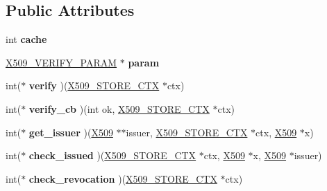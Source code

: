 \subsection*{Public Attributes}
\begin{DoxyCompactItemize}
\item 
\mbox{\label{structx509__store__st_a39100a4cc433d10485ffe0c30c5b88f8}} 
int {\bfseries cache}
\item 
\mbox{\label{structx509__store__st_a988c764019923790356d956bc071c50b}} 
\hyperlink{struct_x509___v_e_r_i_f_y___p_a_r_a_m__st}{X509\+\_\+\+V\+E\+R\+I\+F\+Y\+\_\+\+P\+A\+R\+AM} $\ast$ {\bfseries param}
\item 
\mbox{\label{structx509__store__st_a942efe26133aadd04d45f30a824644a7}} 
int($\ast$ {\bfseries verify} )(\hyperlink{structx509__store__ctx__st}{X509\+\_\+\+S\+T\+O\+R\+E\+\_\+\+C\+TX} $\ast$ctx)
\item 
\mbox{\label{structx509__store__st_a2babc2b1c606dc4a45bee39bcb2dddad}} 
int($\ast$ {\bfseries verify\+\_\+cb} )(int ok, \hyperlink{structx509__store__ctx__st}{X509\+\_\+\+S\+T\+O\+R\+E\+\_\+\+C\+TX} $\ast$ctx)
\item 
\mbox{\label{structx509__store__st_a1201b752d9780b08579097b6f53f05b6}} 
int($\ast$ {\bfseries get\+\_\+issuer} )(\hyperlink{structx509__st}{X509} $\ast$$\ast$issuer, \hyperlink{structx509__store__ctx__st}{X509\+\_\+\+S\+T\+O\+R\+E\+\_\+\+C\+TX} $\ast$ctx, \hyperlink{structx509__st}{X509} $\ast$x)
\item 
\mbox{\label{structx509__store__st_a28e3031f30d155bfcee3077781875dd5}} 
int($\ast$ {\bfseries check\+\_\+issued} )(\hyperlink{structx509__store__ctx__st}{X509\+\_\+\+S\+T\+O\+R\+E\+\_\+\+C\+TX} $\ast$ctx, \hyperlink{structx509__st}{X509} $\ast$x, \hyperlink{structx509__st}{X509} $\ast$issuer)
\item 
\mbox{\label{structx509__store__st_af48617053d5abd22e6f0bb877a3801d9}} 
int($\ast$ {\bfseries check\+\_\+revocation} )(\hyperlink{structx509__store__ctx__st}{X509\+\_\+\+S\+T\+O\+R\+E\+\_\+\+C\+TX} $\ast$ctx)
\item 
$$
\end{DoxyCompactItemize}
